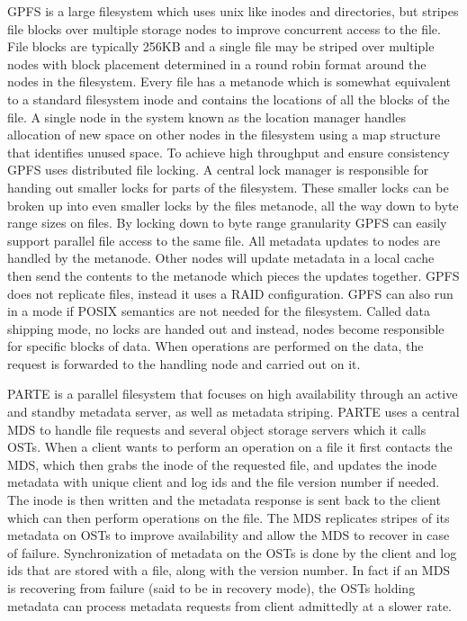 GPFS \cite{Schmuck2002} is a large filesystem which uses unix like inodes and
directories, but stripes file blocks over multiple storage nodes to improve
concurrent access to the file. File blocks are typically 256KB and a single
file may be striped over multiple nodes with block placement determined in a
round robin format around the nodes in the filesystem. Every file has a
metanode which is somewhat equivalent to a standard filesystem inode and
contains the locations of all the blocks of the file. A single node in the
system known as the location manager handles allocation of new space on other
nodes in the filesystem using a map structure that identifies unused space. To
achieve high throughput and ensure consistency GPFS uses distributed file
locking. A central lock manager is responsible for handing out smaller locks
for parts of the filesystem. These smaller locks can be broken up into even
smaller locks by the files metanode, all the way down to byte range sizes on
files. By locking down to byte range granularity GPFS can easily support
parallel file access to the same file. All metadata updates to nodes are
handled by the metanode. Other nodes will update metadata in a local cache
then send the contents to the metanode which pieces the updates together. GPFS
does not replicate files, instead it uses a RAID configuration. GPFS can also
run in a mode if POSIX semantics are not needed for the filesystem. Called
data shipping mode, no locks are handed out and instead, nodes become
responsible for specific blocks of data. When operations are performed on the
data, the request is forwarded to the handling node and carried out on it.


PARTE  \cite{Liao2012} is a parallel filesystem that focuses on high
availability through an active and standby metadata server, as well as
metadata striping. PARTE uses a central MDS to handle file requests and
several object storage servers which it calls OSTs. When a client wants to
perform an operation on a file it first contacts the MDS, which then grabs the
inode of the requested file, and updates the inode metadata with unique client
and log ids and the file version number if needed. The inode is then written
and the metadata response is sent back to the client which can then perform
operations on the file. The MDS replicates stripes of its metadata on OSTs to
improve availability and allow the MDS to recover in case of failure.
Synchronization of metadata on the OSTs is done by the client and log ids that
are stored with a file, along with the version number. In fact if an MDS is
recovering from failure (said to be in recovery mode), the OSTs holding
metadata can process metadata requests from client admittedly at a slower
rate.


